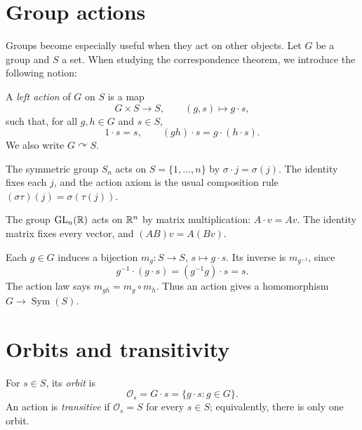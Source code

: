 \documentclass[reqno,11pt]{amsart}
\begin{document}
\makelecturetitle

\section{Group actions}

Groups become especially useful when they act on other objects.
Let $G$ be a group and $S$ a set. When studying the correspondence theorem, we introduce the following notion:

\begin{define}\label{def:action}
A \emph{left action} of $G$ on $S$ is a map
\[
  G\times S\longrightarrow S,\qquad (g,s)\longmapsto g\cdot s,
\]
such that, for all $g,h\in G$ and $s\in S$,
\[
  1\cdot s=s,
  \qquad (gh)\cdot s=g\cdot(h\cdot s).
\]
We also write $G\curvearrowright S$.
\end{define}

\begin{example}[Permutations]
The symmetric group $S_n$ acts on $S=\{1,\ldots,n\}$ by
$\sigma\cdot j=\sigma(j)$. The identity fixes each $j$, and the
action axiom is the usual composition rule
$(\sigma\tau)(j)=\sigma(\tau(j))$.
\end{example}

\begin{example}
The group $\operatorname{GL}_n(\mathbb{R})$ acts on $\mathbb{R}^n$ by matrix multiplication:
$A\cdot v=Av$. The identity matrix fixes every vector, and
$(AB)v=A(Bv)$.
\end{example}

\begin{remark}
Each $g\in G$ induces a bijection
$m_g:S\to S$, $s\mapsto g\cdot s$. Its inverse is $m_{g^{-1}}$,
since
\[
  g^{-1}\cdot(g\cdot s)=(g^{-1}g)\cdot s=s.
\]
The action law says $m_{gh}=m_g\circ m_h$. Thus an action gives a
homomorphism $G\to\operatorname{Sym}(S)$.
\end{remark}

\section{Orbits and transitivity}

\begin{define}[Orbit]\label{def:orbit}
For $s\in S$, its \emph{orbit} is
\[
  \mathcal O_s=G\cdot s=\{g\cdot s:g\in G\}.
\]
An action is \emph{transitive} if $\mathcal O_s=S$ for every
$s\in S$; equivalently, there is only one orbit.
\end{define}
\end{document}
